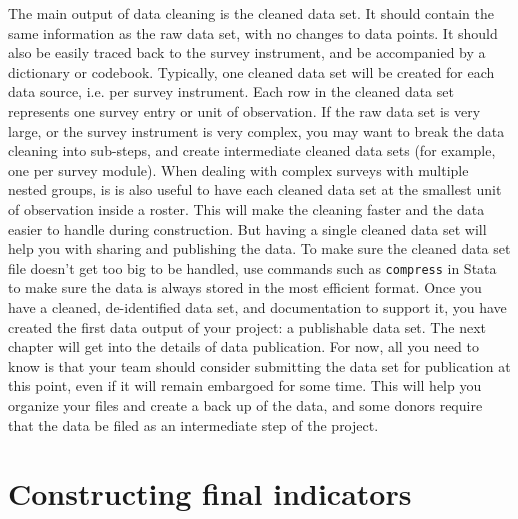 The main output of data cleaning is the cleaned data set. 
It should contain the same information as the raw data set,
with no changes to data points.
It should also be easily traced back to the survey instrument,
and be accompanied by a dictionary or codebook.
Typically, one cleaned data set will be created for each data source,
i.e. per survey instrument.
Each row in the cleaned data set represents one survey entry or unit of observation.
If the raw data set is very large, or the survey instrument is very complex,
you may want to break the data cleaning into sub-steps, 
and create intermediate cleaned data sets
(for example, one per survey module).
When dealing with complex surveys with multiple nested groups,
is is also useful to have each cleaned data set at the smallest unit of observation inside a roster.
This will make the cleaning faster and the data easier to handle during construction.
But having a single cleaned data set will help you with sharing and publishing the data.
To make sure the cleaned data set file doesn't get too big to be handled,
use commands such as \texttt{compress} in Stata to make sure the data
is always stored in the most efficient format.
Once you have a cleaned, de-identified data set, and documentation to support it, 
you have created the first data output of your project:
a publishable data set.
The next chapter will get into the details of data publication.
For now, all you need to know is that your team should consider submitting the data set for publication at this point,
even if it will remain embargoed for some time.
This will help you organize your files and create a back up of the data,
and some donors require that the data be filed as an intermediate step of the project.

\section{Constructing final indicators}

